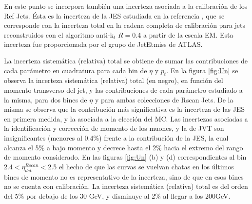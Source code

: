 En este punto se incorpora también una incerteza asociada a la calibración de los Ref Jets. Ésta es la incerteza de la JES estudiada en la referencia \cite{JESpaper}, que se corresponde con la incerteza total en la cadena completa de calibración para jets reconstruidos con el algoritmo anti-k$_t$ $R=$0.4 a partir de la escala EM. Esta incerteza fue proporcionada por el grupo de JetEtmiss de ATLAS.

La incerteza sistemática (relativa) total se obtiene de sumar las contribuciones de cada parámetro en cuadratura para cada bin de $\eta$ y $p_t$. 
En la figura \ref{fig:Un} se observa la incerteza sistemática (relativa) total (en negro), en función del momento transverso del jet, y las contribuciones de cada parámetro estudiado a la misma, para dos bines de $\eta$ y para ambas colecciones de Rscan Jets. De la misma se observa que la contribución más significativa es la incerteza de las JES en primera medida, y la asociada a la elección del MC. Las incertezas asociadas a la identificación y  corrección de momento de los muones, y la de JVT son insignificantes (menores al 0.4$\%$) frente a la contribución de la JES, la cual alcanza el 5$\%$ a bajo momento y decrece hasta el 2$\%$ hacia el extremo del rango de momento considerado. En las figuras \ref{fig:Un} (b) y (d) correspondientes al bin 2.4$<\eta^{Rscan}_{det}<$2.5 el hecho de que las curvas se vuelvan chatas en los últimos bines de momento no es representativo de la incerteza, sino de que en esos bines no se cuenta con calibración. 
La incerteza sistemática (relativa) total es del orden del 5$\%$ por debajo de los 30 GeV, y disminuye al 2$\%$ al llegar a los 200GeV.


